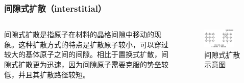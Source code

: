 \documentclass[xcolor=table,dvipsnames,svgnames,aspectratio=169]{ctexbeamer}
\begin{document}
\begin{frame}
  \frametitle{间隙式扩散（interstitial）}

  \begin{columns}
    \begin{column}{0.7\textwidth}
      间隙式扩散是指原子在材料的晶格间隙中移动的现象。这种扩散方式的特点是扩散原子较小，可以穿过较大的基体原子之间的间隙。相比于置换式扩散，间隙式扩散更为迅速，因为间隙原子需要克服的势垒较低，并且其扩散路径较短。
    \end{column}
    \begin{column}{0.3\textwidth}
      \begin{figure}
        \centering
        \includegraphics[width=0.8\textwidth]{间隙式扩散示意图.jpeg}
        \caption{间隙式扩散示意图}
      \end{figure}
    \end{column}
  \end{columns}

\end{frame}
\end{document}

